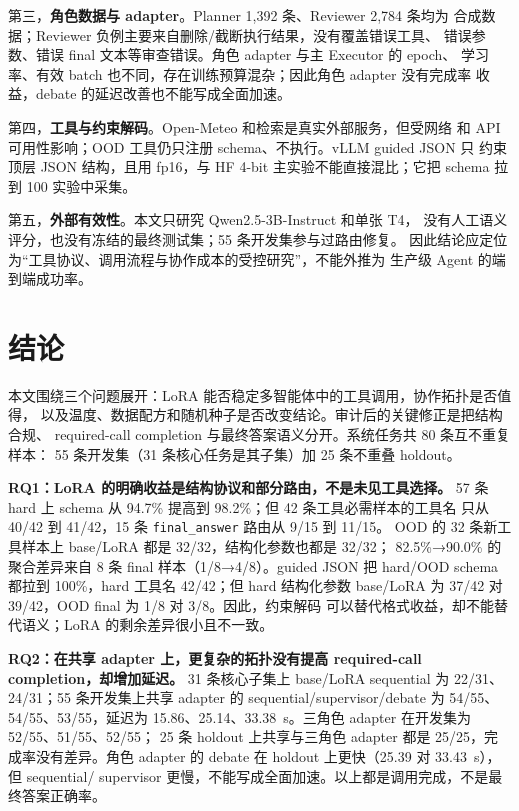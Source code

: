 \documentclass[UTF8,a4paper,12pt]{ctexart}
\begin{document}
第三，\textbf{角色数据与 adapter}。Planner 1,392 条、Reviewer 2,784 条均为
合成数据；Reviewer 负例主要来自删除/截断执行结果，没有覆盖错误工具、
错误参数、错误 final 文本等审查错误。角色 adapter 与主 Executor 的 epoch、
学习率、有效 batch 也不同，存在训练预算混杂；因此角色 adapter 没有完成率
收益，debate 的延迟改善也不能写成全面加速。

第四，\textbf{工具与约束解码}。Open-Meteo 和检索是真实外部服务，但受网络
和 API 可用性影响；OOD 工具仍只注册 schema、不执行。vLLM guided JSON 只
约束顶层 JSON 结构，且用 fp16，与 HF 4-bit 主实验不能直接混比；它把
schema 拉到 100%
实验中采集。

第五，\textbf{外部有效性}。本文只研究 Qwen2.5-3B-Instruct 和单张 T4，
没有人工语义评分，也没有冻结的最终测试集；55 条开发集参与过路由修复。
因此结论应定位为“工具协议、调用流程与协作成本的受控研究”，不能外推为
生产级 Agent 的端到端成功率。

\clearpage
\section{结论}\label{sec:conclusion}
本文围绕三个问题展开：LoRA 能否稳定多智能体中的工具调用，协作拓扑是否值得，
以及温度、数据配方和随机种子是否改变结论。审计后的关键修正是把结构合规、
required-call completion 与最终答案语义分开。系统任务共 80 条互不重复样本：
55 条开发集（31 条核心任务是其子集）加 25 条不重叠 holdout。

\textbf{RQ1：LoRA 的明确收益是结构协议和部分路由，不是未见工具选择。}
57 条 hard 上 schema 从 94.7\% 提高到 98.2\%；但 42 条工具必需样本的工具名
只从 40/42 到 41/42，15 条 \texttt{final\_answer} 路由从 9/15 到 11/15。
OOD 的 32 条新工具样本上 base/LoRA 都是 32/32，结构化参数也都是 32/32；
82.5\%→90.0\% 的聚合差异来自 8 条 final 样本（1/8→4/8）。guided JSON 把
hard/OOD schema 都拉到 100\%，hard 工具名 42/42；但 hard 结构化参数
base/LoRA 为 37/42 对 39/42，OOD final 为 1/8 对 3/8。因此，约束解码
可以替代格式收益，却不能替代语义；LoRA 的剩余差异很小且不一致。

\textbf{RQ2：在共享 adapter 上，更复杂的拓扑没有提高 required-call completion，却增加延迟。}
31 条核心子集上 base/LoRA sequential 为 22/31、24/31；55 条开发集上共享
adapter 的 sequential/supervisor/debate 为 54/55、54/55、53/55，延迟为
15.86、25.14、33.38~s。三角色 adapter 在开发集为 52/55、51/55、52/55；
25 条 holdout 上共享与三角色 adapter 都是 25/25，完成率没有差异。角色
adapter 的 debate 在 holdout 上更快（25.39 对 33.43~s），但 sequential/
supervisor 更慢，不能写成全面加速。以上都是调用完成，不是最终答案正确率。
\end{document}
